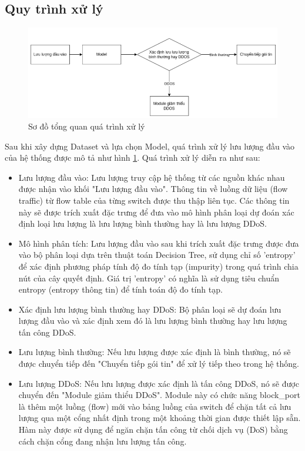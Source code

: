 \documentclass[a4paper]{article}
\begin{document}
\subsection{Quy trình xử lý}
\begin{figure}
    \centering
    \includegraphics[width=0.8\linewidth]{images//result/sodoxuly.png}
    \caption{Sơ đồ tổng quan quá trình xử lý}
    \label{fig:sodoxuly}
\end{figure}
Sau khi xây dựng Dataset và lựa chọn Model, quá trình xử lý lưu lượng đầu vào của hệ thống được mô tả như hình \ref{fig:sodoxuly}. Quá trình xử lý diễn ra như sau:
\begin{itemize}
    \item Lưu lượng đầu vào: Lưu lượng truy cập hệ thống từ các nguồn khác nhau được nhận vào khối "Lưu lượng đầu vào". Thông tin về luồng dữ liệu (flow traffic) từ flow table của từng switch được thu thập liên tục. Các thông tin này sẽ được trích xuất đặc trưng để đưa vào mô hình phân loại dự đoán xác định loại lưu lượng là lưu lượng bình thường hay là lưu lượng DDoS. 
    \item Mô hình phân tích: Lưu lượng đầu vào sau khi trích xuất đặc trưng được đưa vào bộ phân loại dựa trên thuật toán Decision Tree, sử dụng chỉ số 'entropy' để xác định phương pháp tính độ đo tính tạp (impurity) trong quá trình chia nút của cây quyết định. Giá trị 'entropy' có nghĩa là sử dụng tiêu chuẩn entropy (entropy thông tin) để tính toán độ đo tính tạp. 
    \item Xác định lưu lượng bình thường hay DDoS: Bộ phân loại sẽ dự đoán lưu lượng đầu vào và xác định xem đó là lưu lượng bình thường hay lưu lượng tấn công DDoS.
    \item Lưu lượng bình thường: Nếu lưu lượng được xác định là bình thường, nó sẽ được chuyển tiếp đến "Chuyển tiếp gói tin" để xử lý tiếp theo trong hệ thống.
    \item Lưu lượng DDoS: Nếu lưu lượng được xác định là tấn công DDoS, nó sẽ được chuyển đến "Module giảm thiểu DDoS". Module này có chức năng block\_port là thêm một luồng (flow) mới vào bảng luồng của switch để chặn tất cả lưu lượng qua một cổng nhất định trong một khoảng thời gian được thiết lập sẵn. Hàm này được sử dụng để ngăn chặn tấn công từ chối dịch vụ (DoS) bằng cách chặn cổng đang nhận lưu lượng tấn công.
\end{itemize}
\end{document}
